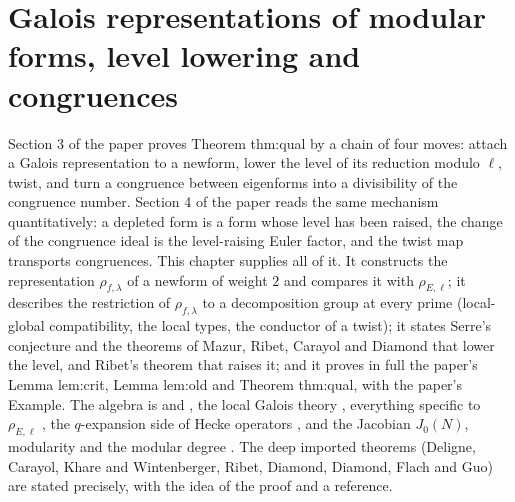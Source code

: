 \chapter{Galois representations of modular forms, level lowering and congruences}\label{ch:modgalrep}

Section 3 of the paper proves Theorem thm:qual by a chain of four moves: attach a Galois representation to a newform, lower the
level of its reduction modulo $\ell$, twist, and turn a congruence between eigenforms into a divisibility of the congruence number.
Section 4 of the paper reads the same mechanism quantitatively: a depleted form is a form whose level has been raised, the change of the
congruence ideal is the level-raising Euler factor, and the twist map transports congruences. This chapter supplies all of it. It
constructs the representation $\rho_{f,\lambda}$ of a newform of weight $2$ and compares it with $\rho_{E,\ell}$; it describes the restriction of
$\rho_{f,\lambda}$ to a decomposition group at every prime (local-global compatibility, the local types, the conductor of a twist); it states Serre's
conjecture and the theorems of Mazur, Ribet, Carayol and Diamond that lower the level, and Ribet's theorem that raises it; and it proves in
full the paper's Lemma lem:crit, Lemma lem:old and Theorem thm:qual, with the paper's Example. The algebra is  and
, the local Galois theory , everything specific to $\rho_{E,\ell}$ , the $q$-expansion side of Hecke
operators , and the Jacobian $J_0(N)$, modularity and the modular degree . The deep imported theorems
(Deligne, Carayol, Khare and Wintenberger, Ribet, Diamond, Diamond, Flach and Guo) are stated precisely, with the idea of the proof and a
reference.

